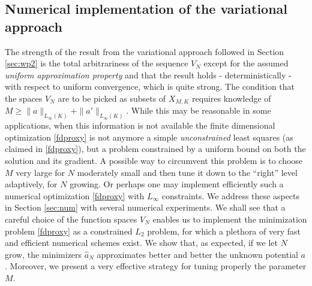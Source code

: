 \subsection{Numerical implementation of the variational approach }\label{sec:wp3}


The strength of the result from the variational approach followed in Section \ref{sec:wp2} is the total arbitrariness of the sequence $V_N$ except
for the assumed {\it uniform approximation property} and that the result holds - deterministically - with respect to uniform convergence, which is quite strong. 
The condition that the spaces $V_N$ are to be picked as subsets of $X_{M,K}$ requires knowledge of $M \geq \|a\|_{L_{\infty}(K)} + \|a'\|_{L_{\infty}(K)}$. While this may be reasonable in some applications, when this information is not available 
the finite dimensional optimization \eqref{fdproxy} is not anymore a simple {\it unconstrained} least squares (as claimed in \eqref{fdproxy}),
but a problem constrained by a uniform bound on both the solution and its gradient. 
A possible way to circumvent this problem is to choose $M$ very large for $N$ moderately small and then tune it  down to the ``right'' level adaptively, for $N$ growing.
Or perhaps one may implement efficiently such a numerical optimization \eqref{fdproxy} with $L_\infty$ constraints.
We address these aspects in Section \ref{sec:num} with several numerical experiments. We shall see that a careful choice of the function spaces $V_N$ enables us to implement the minimization problem \eqref{fdproxy} as a constrained $L_2$ problem, for which a plethora of very fast and efficient numerical schemes exist. We show that, as expected, if we let $N$ grow, the minimizers $\widehat{a}_N$ approximates better and better the unknown potential $a$. Moreover, we present a very effective strategy for tuning properly the parameter $M$.
\\

